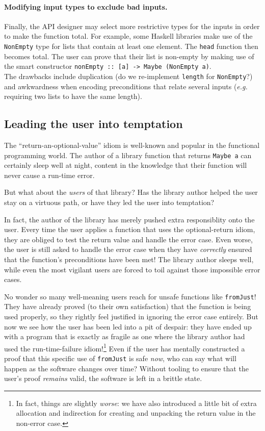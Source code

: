 \documentclass[format=sigplan, review=false, screen=true]{acmart}
\begin{document}
\paragraph{Modifying input types to exclude bad inputs.}
Finally, the API designer may select more restrictive types for the inputs in order
to make the function total. For example, some Haskell libraries make use of the
\texttt{NonEmpty} type for lists that contain at least one element. The \texttt{head}
function then becomes total. The user 
can prove that their list is non-empty by making use of the smart constructor
\texttt{nonEmpty :: [a] -> Maybe (NonEmpty a)}.\\
The drawbacks include duplication
(do we re-implement \texttt{length} for \texttt{NonEmpty}?)
and awkwardness when encoding preconditions that relate
several inputs (\textit{e.g.} requiring two lists to have the same length).

\subsection{Leading the user into temptation}
The ``return-an-optional-value'' idiom is well-known and popular in the functional
programming world. The author of a library function that returns \texttt{Maybe a}
can certainly sleep well at night, content in the knowledge that their function
will never cause a run-time error.

But what about the \emph{users} of that library? Has the library author helped the user stay
on a virtuous path, or have they led the user into temptation?

In fact, the author of the library has merely pushed extra responsiblity onto the user.
Every time the user applies a function that uses the optional-return idiom, they are obliged
to test the return value and handle the error case. Even worse, the user is still asked
to handle the error case when they have \emph{correctly} ensured that the function's
preconditions have been met! The library author sleeps well, while even the most vigilant
users are forced to toil against those impossible error cases.

No wonder so many well-meaning users reach for unsafe functions like \texttt{fromJust}!
They have already proved (to their own satisfaction) that the function is being used properly, so they rightly
feel justified in ignoring the error case entirely. But now we see how the user has been led into
a pit of despair: they have ended up with a program that is exactly as fragile as one where the library
author had used the run-time-failure idiom!\footnote{In fact, things are slightly \emph{worse}: we have also introduced a little
bit of extra allocation and indirection for creating and unpacking the return value in the non-error case.}
Even if the user has mentally constructed a proof that this specific use of \texttt{fromJust} is safe \emph{now},
who can say what will
happen as the software changes over time? Without tooling to ensure that the user's proof \emph{remains} valid,
the software is left in a brittle state.
\end{document}

